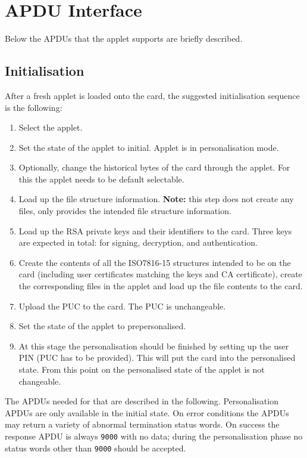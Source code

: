 \documentclass{article}
\begin{document}
\section{APDU Interface}

Below the APDUs that the applet supports are briefly described.

\subsection{Initialisation}

After a fresh applet is loaded onto the card, the suggested initialisation
sequence is the following:
\begin{enumerate}
\item Select the applet.
\item Set the state of the applet to \textsf{initial}. Applet is in personalisation mode.
\item Optionally, change the historical bytes of the card through the applet. For this the 
applet needs to be default selectable.
\item Load up the file structure information. \textbf{Note:} this step does
not create any files, only provides the intended file structure information.
\item Load up the RSA private keys and their identifiers to the card. Three keys are expected
in total: for signing, decryption, and authentication.
\item Create the contents of all the ISO7816-15 structures intended to 
be on the card (including user certificates matching the keys and CA certificate),
create the corresponding files in the applet
and load up the file contents to the card.
\item Upload the PUC to the card. The PUC is unchangeable.
\item Set the state of the applet to \textsf{prepersonalised}.
\item At this stage the personalisation should be finished by setting up the user PIN (PUC has to be provided).
This will put the card into the \textsf{personalised} state. From this point on the personalised state of the
applet is not changeable.
\end{enumerate}

The APDUs needed for that are described in the following. 
Personalisation APDUs are only available in the \textsf{initial} state.
On error conditions the APDUs may return a variety of abnormal termination
status words. On success the response APDU is always \texttt{9000}
with no data; during the personalisation phase
no status words other than \texttt{9000} should be accepted.
\end{document}
